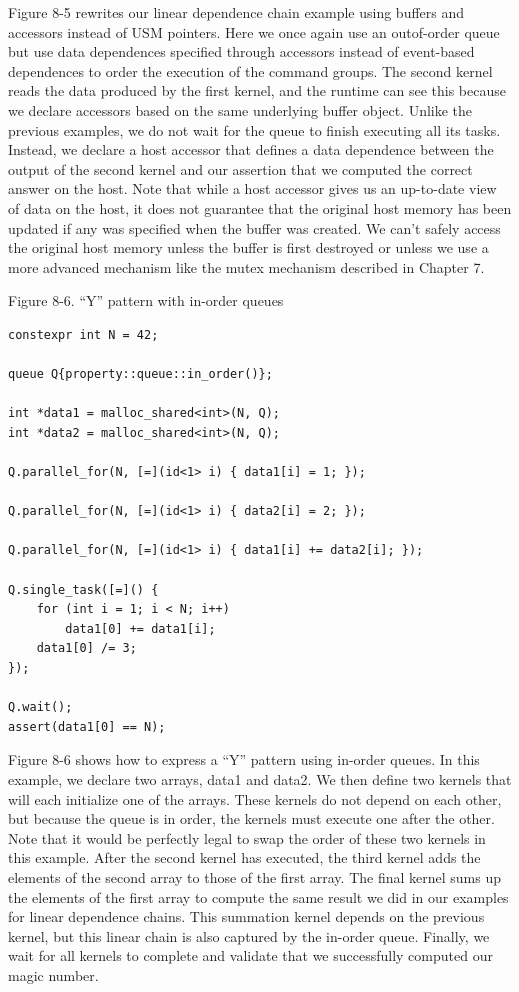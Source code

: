 Figure 8-5 rewrites our linear dependence chain example using buffers and accessors instead of USM pointers. Here we once again use an outof-order queue but use data dependences specified through accessors instead of event-based dependences to order the execution of the command groups. The second kernel reads the data produced by the first kernel, and the runtime can see this because we declare accessors based on the same underlying buffer object. Unlike the previous examples, we do not wait for the queue to finish executing all its tasks. Instead, we declare a host accessor that defines a data dependence between the output of the second kernel and our assertion that we computed the correct answer on the host. Note that while a host accessor gives us an up-to-date view of data on the host, it does not guarantee that the original host memory has been updated if any was specified when the buffer was created. We can’t safely access the original host memory unless the buffer is first destroyed or unless we use a more advanced mechanism like the mutex mechanism described in Chapter 7.\par

\hspace*{\fill} \par %
Figure 8-6. “Y” pattern with in-order queues
\begin{lstlisting}[caption={}]
constexpr int N = 42;

queue Q{property::queue::in_order()};

int *data1 = malloc_shared<int>(N, Q);
int *data2 = malloc_shared<int>(N, Q);

Q.parallel_for(N, [=](id<1> i) { data1[i] = 1; });

Q.parallel_for(N, [=](id<1> i) { data2[i] = 2; });

Q.parallel_for(N, [=](id<1> i) { data1[i] += data2[i]; });

Q.single_task([=]() {
	for (int i = 1; i < N; i++)
		data1[0] += data1[i];
	data1[0] /= 3;
});

Q.wait();
assert(data1[0] == N);
\end{lstlisting}

Figure 8-6 shows how to express a “Y” pattern using in-order queues. In this example, we declare two arrays, data1 and data2. We then define two kernels that will each initialize one of the arrays. These kernels do not depend on each other, but because the queue is in order, the kernels must execute one after the other. Note that it would be perfectly legal to swap the order of these two kernels in this example. After the second kernel has executed, the third kernel adds the elements of the second array to those of the first array. The final kernel sums up the elements of the first array to compute the same result we did in our examples for linear dependence chains. This summation kernel depends on the previous kernel, but this linear chain is also captured by the in-order queue. Finally, we wait for all kernels to complete and validate that we successfully computed our magic number.\par

